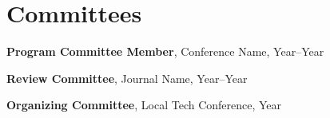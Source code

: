 \section{Committees}

\begin{cvitems}
  \item {\textbf{Program Committee Member}, Conference Name, Year--Year}
  \item {\textbf{Review Committee}, Journal Name, Year--Year}
  \item {\textbf{Organizing Committee}, Local Tech Conference, Year}
\end{cvitems}